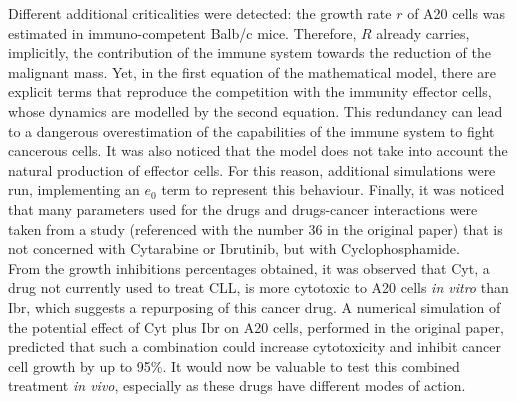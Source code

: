 Different additional criticalities were detected: the growth rate $r$ of A20 cells was estimated in immuno-competent Balb/c mice. Therefore, $R$ already carries, implicitly, the contribution of the immune system towards the reduction of the malignant mass. Yet, in the first equation of the mathematical model, there are explicit terms that reproduce the competition with the immunity effector cells, whose dynamics are modelled by the second equation. This redundancy can lead to a dangerous overestimation of the capabilities of the immune system to fight cancerous cells. It was also noticed that the model does not take into account the natural production of effector cells. For this reason, additional simulations were run, implementing an $e_{0}$ term to represent this behaviour. Finally, it was noticed that many parameters used for the drugs and drugs-cancer interactions were taken from a study (referenced with the number 36 in the original paper) that is not concerned with Cytarabine or Ibrutinib, but with Cyclophosphamide. \\
From the growth inhibitions percentages obtained, it was observed that Cyt, a drug not currently used to treat CLL, is more cytotoxic to A20 cells \textit{in vitro} than Ibr, which suggests a repurposing of this cancer drug. A numerical simulation of the potential effect of Cyt plus Ibr on A20 cells, performed in the original paper, predicted that such a combination could increase cytotoxicity and inhibit cancer cell growth by up to 95\%. It would now be valuable to test this combined treatment \textit{in vivo}, especially as these drugs have different modes of action. 
